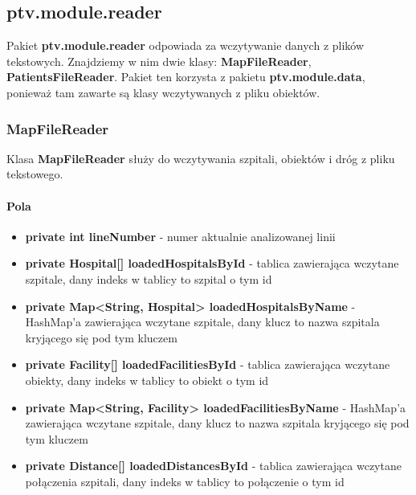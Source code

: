 \documentclass[]{article}
\begin{document}
        \subsection{ptv.module.reader} %
            Pakiet \textbf{ptv.module.reader} odpowiada za wczytywanie danych z plików tekstowych.
            Znajdziemy w nim dwie klasy: \textbf{MapFileReader}, \textbf{PatientsFileReader}.
            Pakiet ten korzysta z pakietu \textbf{ptv.module.data}, ponieważ tam zawarte są klasy wczytywanych z pliku obiektów.
        
            \subsubsection{MapFileReader}
                Klasa \textbf{MapFileReader} służy do wczytywania szpitali, obiektów i dróg z pliku tekstowego.
                
                \paragraph{Pola}
                    \begin{itemize}
                        \item \textbf{private int lineNumber} - numer aktualnie analizowanej linii
                        \item \textbf{private Hospital[] loadedHospitalsById} - tablica zawierająca wczytane szpitale, dany indeks w tablicy to szpital o tym id
                        \item \textbf{private Map<String, Hospital> loadedHospitalsByName} - HashMap'a zawierająca wczytane szpitale, dany klucz to nazwa szpitala kryjącego się pod tym kluczem
                        \item \textbf{private Facility[] loadedFacilitiesById} - tablica zawierająca wczytane obiekty, dany indeks w tablicy to obiekt o tym id
                        \item \textbf{private Map<String, Facility> loadedFacilitiesByName} - HashMap'a zawierająca wczytane szpitale, dany klucz to nazwa szpitala kryjącego się pod tym kluczem
                        \item \textbf{private Distance[] loadedDistancesById} - tablica zawierająca wczytane połączenia szpitali, dany indeks w tablicy to połączenie o tym id
                    \end{itemize}
                
\end{document}
